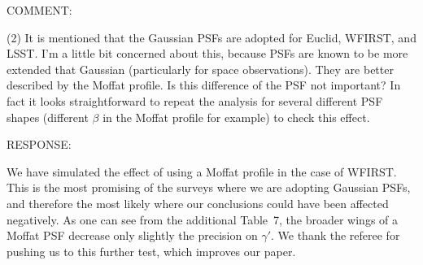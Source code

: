 \documentclass[a4paper,11pt]{article}
\begin{document}
COMMENT:

(2) It is mentioned that the Gaussian PSFs are adopted for Euclid,
WFIRST, and LSST. I'm a little bit concerned about this, because PSFs
are known to be more extended that Gaussian (particularly for space
observations). They are better described by the Moffat profile. Is
this difference of the PSF not important? In fact it looks
straightforward to repeat the analysis for several different PSF
shapes (different $\beta$ in the Moffat profile for example) to check
this effect.

RESPONSE:

We have simulated the effect of using a Moffat profile in the case of
WFIRST. This is the most promising of the surveys where we are
adopting Gaussian PSFs, and therefore the most likely where our
conclusions could have been affected negatively. As one can see from
the additional Table~7, the broader wings of a Moffat PSF decrease
only slightly the precision on $\gamma'$. We thank the referee for
pushing us to this further test, which improves our paper.
\end{document}
